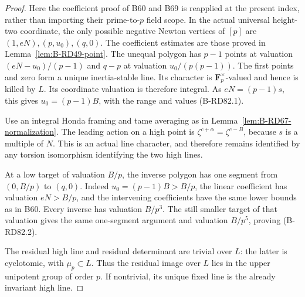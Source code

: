 \begin{proof}
Here the coefficient proof of B60 and B69 is reapplied at the
present index, rather than importing their prime-to-\(p\)
field scope. In the actual universal height-two coordinate,
the only possible negative Newton vertices of \([p]\) are
\((1,eN),(p,u_0),(q,0)\). The coefficient estimates are
those proved in Lemma~\ref{lem:B-RD49-point}. The unequal
polygon has \(p-1\) points at valuation
\((eN-u_0)/(p-1)\) and \(q-p\) at valuation
\(u_0/(p(p-1))\). The first points and zero form a
unique inertia-stable line. Its character is
\(\mathbf F_p^\times\)-valued and hence is killed by \(L\).
Its coordinate valuation is therefore integral. As
\(eN=(p-1)s\), this gives \(u_0=(p-1)B\), with the
range and values (B-RD82.1).

Use an integral Honda framing and tame averaging as in
Lemma~\ref{lem:B-RD67-normalization}. The leading action
on a high point is \(\zeta^{c+\alpha}=\zeta^{c-B}\),
because \(s\) is a multiple of \(N\). This is an actual
line character, and therefore remains identified by any
torsion isomorphism identifying the two high lines.

At a low target of valuation \(B/p\), the inverse polygon
has one segment from \((0,B/p)\) to \((q,0)\).
Indeed \(u_0=(p-1)B>B/p\), the linear coefficient has
valuation \(eN>B/p\), and the intervening coefficients
have the same lower bounds as in B60. Every inverse has
valuation \(B/p^3\). The still smaller target of that
valuation gives the same one-segment argument and
valuation \(B/p^5\), proving (B-RD82.2).

The residual high line and residual determinant are trivial
over \(L\): the latter is cyclotomic, with \(\mu_p\subset L\).
Thus the residual image over \(L\) lies in the upper
unipotent group of order \(p\). If nontrivial, its unique
fixed line is the already invariant high line.
\end{proof}

